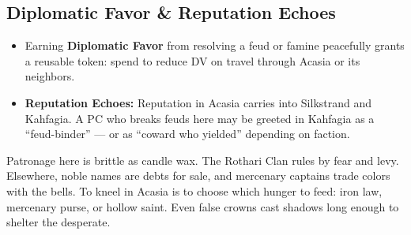 \subsection*{Diplomatic Favor \& Reputation Echoes}
\begin{itemize}
  \item Earning \textbf{Diplomatic Favor} from resolving a feud or famine peacefully grants a reusable token: spend to reduce DV on travel through Acasia or its neighbors.
  \item \textbf{Reputation Echoes:} Reputation in Acasia carries into Silkstrand and Kahfagia. A PC who breaks feuds here may be greeted in Kahfagia as a “feud-binder” — or as “coward who yielded” depending on faction.
\end{itemize}

\begin{tcolorbox}[colback=black!3,colframe=black!40!white,title={Decline \& Patronage}]
Patronage here is brittle as candle wax. The Rothari Clan rules by fear and levy. Elsewhere, noble names are debts for sale, and mercenary captains trade colors with the bells. To kneel in Acasia is to choose which hunger to feed: iron law, mercenary purse, or hollow saint. Even false crowns cast shadows long enough to shelter the desperate.
\end{tcolorbox}